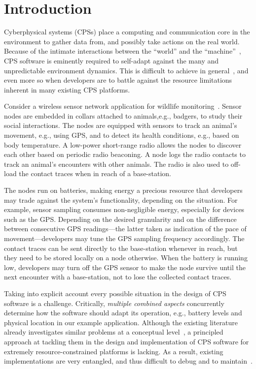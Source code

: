 \section{Introduction}

Cyberphysical systems (CPSs) place a computing and communication core
in the environment to gather data from, and possibly take actions on
the real world. Because of the intimate interactions between the
``world'' and the ``machine''~\cite{Jackson:1995:WM:225014.225041},
CPS software is eminently required to self-adapt against the many and
unpredictable environment dynamics. This is difficult to achieve in
general~\cite{cheng:adaptive}, and even more so when developers are to
battle against the resource limitations inherent in many existing CPS
platforms.

 Consider a wireless sensor network application for
wildlife monitoring~\cite{pasztor10:selective}.  Sensor nodes are
embedded in collars attached to animals,e.g., badgers, to study their
social interactions. The nodes are equipped with sensors to track an
animal's movement, e.g., using GPS, and to detect its health
conditions, e.g., based on body temperature.  A low-power short-range
radio allows the nodes to discover each other based on periodic radio
beaconing.  A node logs the radio contacts to track an animal's
encounters with other animals. The radio is also used to off-load the
contact traces when in reach of a base-station. 

The nodes run on batteries, making energy a precious resource that
developers may trade against the system's functionality, depending on
the situation. For example, sensor sampling consumes non-negligible
energy, especially for devices such as the GPS. Depending on the
desired granularity and on the difference between consecutive GPS
readings---the latter taken as indication of the pace of
movement---developers may tune the GPS sampling frequency
accordingly. The contact traces can be sent directly to the
base-station whenever in reach, but they need to be stored locally on
a node otherwise.  When the battery is running low, developers may
turn off the GPS sensor to make the node survive until the next
encounter with a base-station, not to lose the collected contact
traces.

 Taking into explicit account every
possible situation in the design of CPS software is a
challenge. Critically, \emph{multiple combined aspects} concurrently
determine how the software should adapt its operation, e.g., battery
levels and physical location in our example application. Although the
existing literature already investigates similar problems at a
conceptual level~\cite{cheng:adaptive}, a principled approach at
tackling them in the design and implementation of CPS software for
extremely resource-constrained platforms is lacking. As a result,
existing implementations are very entangled, and thus difficult to
debug and to maintain~\cite{Picco:2010:SEW:1882362.1882421}.

